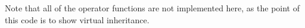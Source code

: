 Note that all of the operator functions are not implemented here, as the point of this code is to show virtual inheritance.
